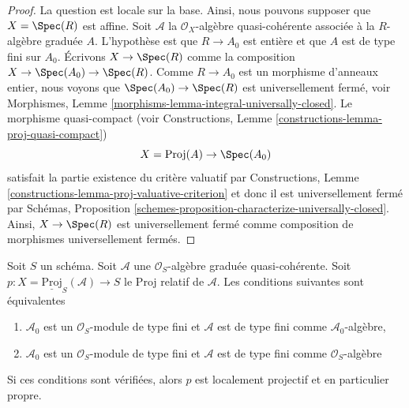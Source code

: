 \begin{proof}
La question est locale sur la base. Ainsi, nous pouvons supposer que  $X = \Spec(R)$ 
est affine. Soit  $\mathcal{A}$  la  $\mathcal{O}_X$-algèbre quasi-cohérente associée à la
 $R$-algèbre graduée  $A$. L'hypothèse est que  $R \to A_0$  est
entière et que  $A$  est de type fini sur  $A_0$. Écrivons
 $X \to \Spec(R)$  comme la composition  $X \to \Spec(A_0) \to \Spec(R)$. Comme  $R \to A_0$  est un
morphisme d'anneaux entier, nous voyons que  $\Spec(A_0) \to \Spec(R)$  est universellement
fermé, voir Morphismes, Lemme  \ref{morphisms-lemma-integral-universally-closed}. Le morphisme quasi-compact (voir
Constructions, Lemme  \ref{constructions-lemma-proj-quasi-compact})
$$
X = \text{Proj}(A) \to \Spec(A_0)
$$
satisfait la partie existence du critère valuatif par Constructions, Lemme
 \ref{constructions-lemma-proj-valuative-criterion}  et donc il est universellement fermé par Schémas, Proposition
 \ref{schemes-proposition-characterize-universally-closed}. Ainsi,  $X \to \Spec(R)$  est universellement fermé comme composition de
morphismes universellement fermés.
\end{proof}

\begin{lemma}
\label{lemma-relative-proj-proper}
Soit  $S$  un schéma. Soit  $\mathcal{A}$  une  $\mathcal{O}_S$-algèbre graduée
quasi-cohérente. Soit  $p : X = \underline{\text{Proj}}_S(\mathcal{A}) \to S$  le Proj relatif de  $\mathcal{A}$. Les conditions
suivantes sont équivalentes
\begin{enumerate}
\item $\mathcal{A}_0$  est un  $\mathcal{O}_S$-module de type fini et  $\mathcal{A}$  est de type
fini comme  $\mathcal{A}_0$-algèbre,
\item $\mathcal{A}_0$  est un  $\mathcal{O}_S$-module de type fini et  $\mathcal{A}$  est de type
fini comme  $\mathcal{O}_S$-algèbre
\end{enumerate}
Si ces conditions sont vérifiées, alors  $p$  est localement projectif et
en particulier propre.
\end{lemma}

